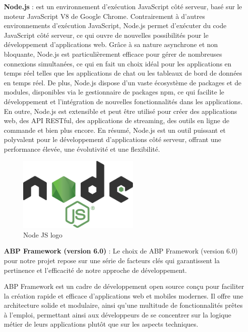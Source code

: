 \textbf{Node.js} : est un environnement d'exécution JavaScript côté serveur, basé sur le moteur JavaScript V8 de Google Chrome. Contrairement à d'autres environnements d'exécution JavaScript, Node.js permet d'exécuter du code JavaScript côté serveur, ce qui ouvre de nouvelles possibilités pour le développement d'applications web. Grâce à sa nature asynchrone et non bloquante, Node.js est particulièrement efficace pour gérer de nombreuses connexions simultanées, ce qui en fait un choix idéal pour les applications en temps réel telles que les applications de chat ou les tableaux de bord de données en temps réel. De plus, Node.js dispose d'un vaste écosystème de packages et de modules, disponibles via le gestionnaire de packages npm, ce qui facilite le développement et l'intégration de nouvelles fonctionnalités dans les applications. En outre, Node.js est extensible et peut être utilisé pour créer des applications web, des API RESTful, des applications de streaming, des outils en ligne de commande et bien plus encore. En résumé, Node.js est un outil puissant et polyvalent pour le développement d'applications côté serveur, offrant une performance élevée, une évolutivité et une flexibilité.
\\
\begin{figure}[H] 
    \centering
    \includegraphics[width=6cm]{Figures/nodejs.png}
        \caption{Node JS logo}
\end{figure}






\textbf{ABP Framework (version 6.0)} : Le choix de ABP Framework (version 6.0) pour notre projet repose sur une série de facteurs clés qui garantissent la pertinence et l'efficacité de notre approche de développement.

ABP Framework est un cadre de développement open source conçu pour faciliter la création rapide et efficace d'applications web et mobiles modernes. Il offre une architecture solide et modulaire, ainsi qu'une multitude de fonctionnalités prêtes à l'emploi, permettant ainsi aux développeurs de se concentrer sur la logique métier de leurs applications plutôt que sur les aspects techniques.

